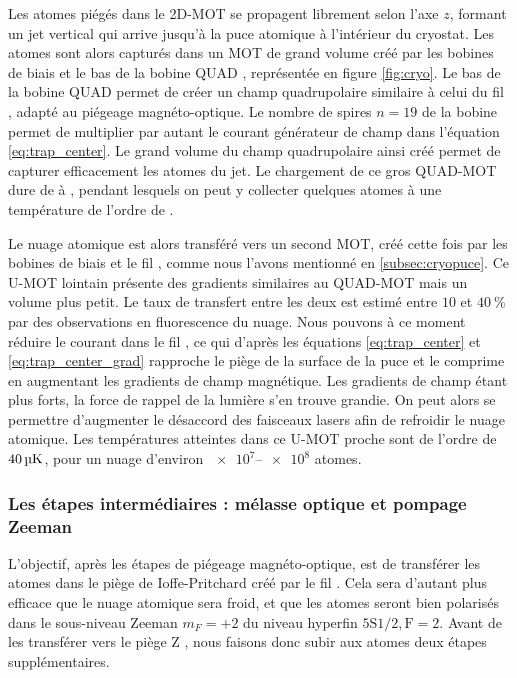 Les atomes piégés dans le 2D-MOT se propagent librement selon l'axe $z$, formant un jet vertical qui arrive jusqu'à la puce atomique à l'intérieur du cryostat.
Les atomes sont alors capturés dans un MOT de grand volume créé par les bobines de biais et le bas de la bobine \og QUAD \fg{}, représentée en figure \eqref{fig:cryo}.
Le bas de la bobine QUAD permet de créer un champ quadrupolaire similaire à celui du fil , adapté au piégeage magnéto-optique.
Le nombre de spires $n=19$ de la bobine permet de multiplier par autant le courant générateur de champ dans l'équation \eqref{eq:trap_center}.
Le grand volume du champ quadrupolaire ainsi créé permet de capturer efficacement les atomes du jet.
Le chargement de ce gros \og QUAD-MOT \fg{} dure de  à , pendant lesquels on peut y collecter quelques  atomes à une température de l'ordre de .

Le nuage atomique est alors transféré vers un second MOT, créé cette fois par les bobines de biais et le fil , comme nous l'avons mentionné en \ref{subsec:cryopuce}.
Ce \og U-MOT lointain\fg{} présente des gradients similaires au QUAD-MOT mais un volume plus petit.
Le taux de transfert entre les deux est estimé entre $\num{10}$ et $\SI{40}{\percent}$ par des observations en fluorescence du nuage.
Nous pouvons à ce moment réduire le courant dans le fil , ce qui d'après les équations \eqref{eq:trap_center} et \eqref{eq:trap_center_grad} rapproche le piège de la surface de la puce et le comprime en augmentant les gradients de champ magnétique.
Les gradients de champ étant plus forts, la force de rappel de la lumière s'en trouve grandie.
On peut alors se permettre d'augmenter le désaccord des faisceaux lasers afin de refroidir le nuage atomique.
Les températures atteintes dans ce \og U-MOT proche\fg{} sont de l'ordre de $\SI{40}{\si{\micro\kelvin}}$, pour un nuage d'environ $\numrange{e7}{e8}$ atomes.

\subsubsection*{Les étapes intermédiaires : mélasse optique et pompage Zeeman}
\noindent L'objectif, après les étapes de piégeage magnéto-optique, est de transférer les atomes dans le piège de Ioffe-Pritchard créé par le fil .
Cela sera d'autant plus efficace que le nuage atomique sera froid, et que les atomes seront bien polarisés dans le sous-niveau Zeeman $m_F=+2$ du niveau hyperfin $\mathrm{5S1/2,F=2}$.
Avant de les transférer vers le \og piège Z \fg{}, nous faisons donc subir aux atomes deux étapes supplémentaires.

